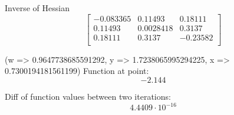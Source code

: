 \documentclass{article}
\begin{document}
Inverse of Hessian
\begin{equation}
\left[
\begin{array}{ccc}
-0.083365 & 0.11493 & 0.18111 \\
0.11493 & 0.0028418 & 0.3137 \\
0.18111 & 0.3137 & -0.23582 \\
\end{array}
\right]
\end{equation}

(w => 0.9647738685591292, y => 1.7238065995294225, x => 0.7300194181561199)
Function at point:
\begin{equation}
-2.144
\end{equation}

Diff of function values between two iterations:
\begin{equation}
4.4409 \cdot 10^{-16}
\end{equation}
\end{document}
